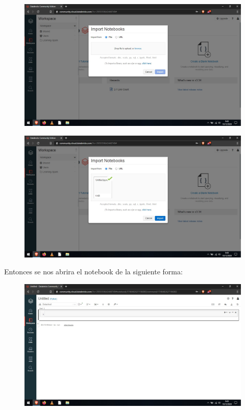 \documentclass[a4paper,10pt]{article}
\begin{document}
\begin{figure}[H]
\begin{center}
\includegraphics[width=500pt]{./fotos/Databricks/12 - Databricks.jpg}
\end{center}
\end{figure}

\begin{figure}[H]
\begin{center}
\includegraphics[width=500pt]{./fotos/Databricks/13 - Databricks.jpg}
\end{center}
\end{figure}

Entonces se nos abrira el notebook de la siguiente forma:

\begin{figure}[H]
\begin{center}
\includegraphics[width=500pt]{./fotos/Databricks/14 - Databricks.jpg}
\end{center}
\end{figure}
\end{document}
